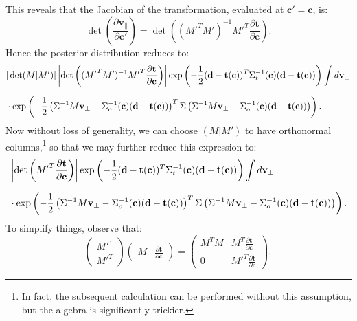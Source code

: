\documentclass[withindex,glossary]{cam-thesis}
\renewcommand{\vec}[1]{\textbf{#1}} %
\begin{document}
This reveals that the Jacobian of the transformation, evaluated at $\vec{c}' = \vec{c}$, is:
\begin{equation}
\det\left( \frac{\partial \vec{v}_{\parallel}}{\partial \vec{c}'}\right) = \det\left( ({M'}^T M')^{-1} {M'}^T \frac{\partial \vec{t}}{\partial \vec{c}} \right).
\end{equation}
Hence the posterior distribution reduces to:
\begin{align}
& |\det(M|M')| \left| \det\left( ({M'}^T M')^{-1} {M'}^T \frac{\partial \vec{t}}{\partial \vec{c}} \right) \right| \exp\left( -\frac{1}{2}(\vec{d} - \vec{t}(\vec{c}))^T\Sigma_t^{-1}(\vec{c}) (\vec{d} - \vec{t}(\vec{c})) \right) \int d\vec{v}_{\perp} \notag\\[1.5ex]
& \cdot \exp\left( -\frac{1}{2} \left(\Sigma^{-1} M \vec{v}_{\perp} - \Sigma_o^{-1}(\vec{c}) (\vec{d} - \vec{t}(\vec{c}))\right)^T \Sigma \left(\Sigma^{-1} M \vec{v}_{\perp} - \Sigma_o^{-1}(\vec{c}) (\vec{d} - \vec{t}(\vec{c}))\right) \right).
\end{align}
Now without loss of generality, we can choose $(M | M')$ to have orthonormal columns,\footnote{In fact, the subsequent calculation can be performed without this assumption, but the algebra is significantly trickier.} so that we may further reduce this expression to:
\begin{align}
& \left| \det\left({M'}^T \frac{\partial \vec{t}}{\partial \vec{c}} \right) \right| \exp\left( -\frac{1}{2}(\vec{d} - \vec{t}(\vec{c}))^T\Sigma_t^{-1}(\vec{c}) (\vec{d} - \vec{t}(\vec{c})) \right) \int d\vec{v}_{\perp} \notag\\[1.5ex]
& \cdot \exp\left( -\frac{1}{2} \left(\Sigma^{-1} M \vec{v}_{\perp} - \Sigma_o^{-1}(\vec{c}) (\vec{d} - \vec{t}(\vec{c}))\right)^T \Sigma \left(\Sigma^{-1} M \vec{v}_{\perp} - \Sigma_o^{-1}(\vec{c}) (\vec{d} - \vec{t}(\vec{c}))\right) \right).
\end{align}
To simplify things, observe that:
\begin{equation}
\begin{pmatrix} M^T \\ {M'}^T \end{pmatrix} \begin{pmatrix} M & \displaystyle \frac{\partial \vec{t}}{\partial \vec{c}} \end{pmatrix} = \begin{pmatrix} M^TM & \displaystyle M^T \frac{\partial \vec{t}}{\partial \vec{c}} \\[1.5ex] 0 & \displaystyle {M'}^T \frac{\partial \vec{t}}{\partial \vec{c}} \end{pmatrix},
\end{equation}
\end{document}

